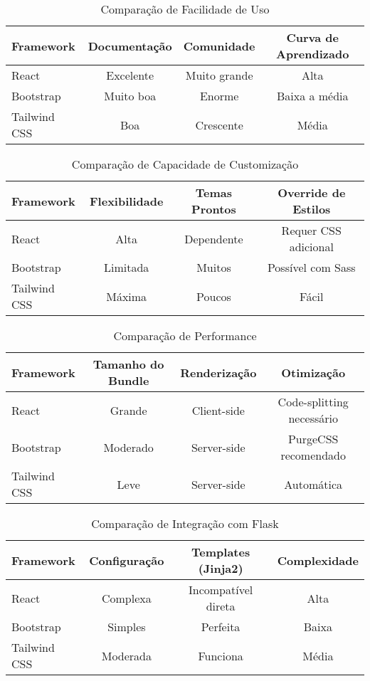 \documentclass[11pt]{article}
\begin{document}
\begin{table}[H]
\centering
\caption{Comparação de Facilidade de Uso}
\begin{tabular}{lccc}
\toprule
\textbf{Framework} & \textbf{Documentação} & \textbf{Comunidade} & \textbf{Curva de Aprendizado} \\
\midrule
React & Excelente & Muito grande & Alta \\
Bootstrap & Muito boa & Enorme & Baixa a média \\
Tailwind CSS & Boa & Crescente & Média \\
\bottomrule
\end{tabular}
\end{table}

\begin{table}[H]
\centering
\caption{Comparação de Capacidade de Customização}
\begin{tabular}{lccc}
\toprule
\textbf{Framework} & \textbf{Flexibilidade} & \textbf{Temas Prontos} & \textbf{Override de Estilos} \\
\midrule
React & Alta & Dependente & Requer CSS adicional \\
Bootstrap & Limitada & Muitos & Possível com Sass \\
Tailwind CSS & Máxima & Poucos & Fácil \\
\bottomrule
\end{tabular}
\end{table}

\begin{table}[H]
\centering
\caption{Comparação de Performance}
\begin{tabular}{lccc}
\toprule
\textbf{Framework} & \textbf{Tamanho do Bundle} & \textbf{Renderização} & \textbf{Otimização} \\
\midrule
React & Grande & Client-side & Code-splitting necessário \\
Bootstrap & Moderado & Server-side & PurgeCSS recomendado \\
Tailwind CSS & Leve & Server-side & Automática \\
\bottomrule
\end{tabular}
\end{table}

\begin{table}[H]
\centering
\caption{Comparação de Integração com Flask}
\begin{tabular}{lccc}
\toprule
\textbf{Framework} & \textbf{Configuração} & \textbf{Templates (Jinja2)} & \textbf{Complexidade} \\
\midrule
React & Complexa & Incompatível direta & Alta \\
Bootstrap & Simples & Perfeita & Baixa \\
Tailwind CSS & Moderada & Funciona & Média \\
\bottomrule
\end{tabular}
\end{table}
\end{document}
